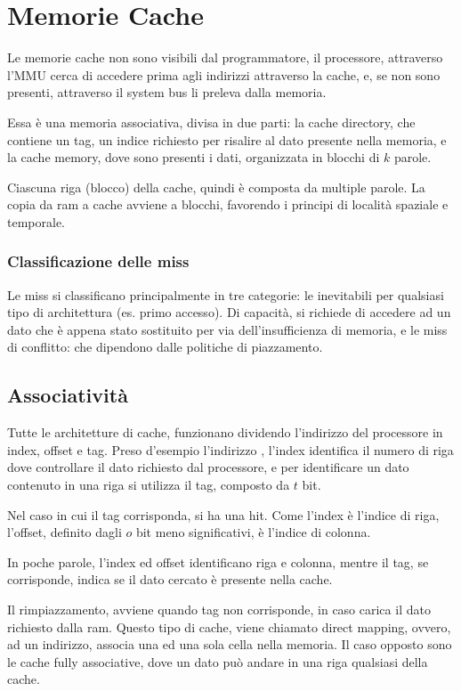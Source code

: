 \documentclass[../template]{subfiles}
\begin{document}
\section{Memorie Cache}
Le memorie cache non sono visibili dal programmatore, il processore, attraverso l'MMU cerca di accedere prima agli indirizzi attraverso la cache, e, se non sono presenti, attraverso il system bus li preleva dalla memoria.

Essa è una memoria associativa, divisa in due parti: la cache directory, che contiene un tag, un indice richiesto per risalire al dato presente nella memoria, e la cache memory, dove sono presenti i dati, organizzata in blocchi di $k$ parole.

Ciascuna riga (blocco) della cache, quindi è composta da multiple parole. La copia da ram a cache avviene a blocchi, favorendo i principi di località spaziale e temporale.

\subsubsection{Classificazione delle miss}
Le miss si classificano principalmente in tre categorie: le inevitabili per qualsiasi tipo di architettura (es. primo accesso).
Di capacità, si richiede di accedere ad un dato che è appena stato sostituito per via dell'insufficienza di memoria, e le miss di conflitto: che dipendono dalle politiche di piazzamento.


\subsection{Associatività}
Tutte le architetture di cache, funzionano dividendo l'indirizzo del processore in index, offset e tag.
Preso d'esempio l'indirizzo , l'index identifica il numero di riga dove controllare il dato richiesto dal processore, e per identificare un dato contenuto in una riga si utilizza il tag, composto da $t$ bit.

Nel caso in cui il tag corrisponda, si ha una hit. Come l'index è l'indice di riga, l'offset, definito dagli $o$ bit meno significativi,  è l'indice di colonna.


In poche parole, l'index ed offset identificano riga e colonna, mentre il tag, se corrisponde, indica se il dato cercato è presente nella cache.

Il rimpiazzamento, avviene quando tag non corrisponde, in caso carica il dato richiesto dalla ram.
Questo tipo di cache, viene chiamato direct mapping, ovvero, ad un indirizzo, associa una ed una sola cella nella memoria.
Il caso opposto sono le cache fully associative, dove un dato può andare in una riga qualsiasi della cache.
\end{document}
